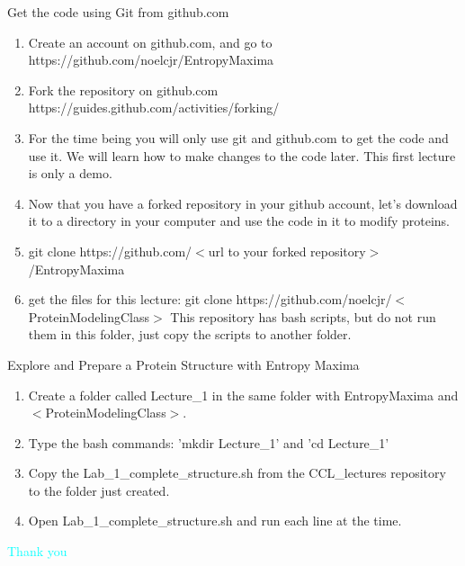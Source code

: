 \documentclass{beamer}
\begin{document}
\begin{frame}[shrink=15]{Get the code using Git from github.com}
       \begin{enumerate}
             \item Create an account on github.com, and go to https://github.com/noelcjr/EntropyMaxima
             \item Fork the repository on github.com https://guides.github.com/activities/forking/
             \item For the time being you will only use git and github.com to get the code and use it.
                   We will learn how to make changes to the code later. This first lecture is only a demo. 
             \item Now that you have a forked repository in your github account, let's download it to a directory
                   in your computer and use the code in it to modify proteins. 
             \item git clone https://github.com/$<$url to your forked repository$>$/EntropyMaxima
             \item get the files for this lecture: git clone https://github.com/noelcjr/$<$ProteinModelingClass$>$
                   This repository has bash scripts, but do not run them in this folder, just copy the scripts to another folder.
       \end{enumerate}
\end{frame}
\begin{frame}[shrink=15]{Explore and Prepare a Protein Structure with Entropy Maxima}
       \begin{enumerate}
             \item Create a folder called Lecture\_1 in the same folder with EntropyMaxima and $<$ProteinModelingClass$>$. 
             \item Type the bash commands: 'mkdir Lecture\_1' and 'cd Lecture\_1'
             \item Copy the Lab\_1\_complete\_structure.sh from the CCL\_lectures repository to the folder just created.
             \item Open Lab\_1\_complete\_structure.sh and run each line at the time.
       \end{enumerate}
\end{frame}

\begin{frame}{}
   \begin{center}
   \textcolor{cyan}{\large Thank you}
   \end{center}
\end{frame}
\end{document}
